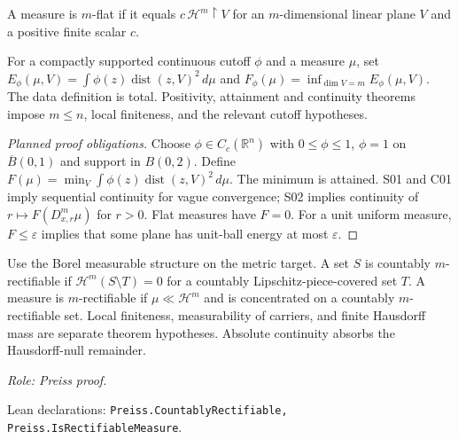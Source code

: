 \begin{definition}
\label{def:flat}










A measure is $m$-flat if it equals $c\,\mathcal H^m\!\restriction V$ for an $m$-dimensional linear plane $V$ and a positive finite scalar $c$.
\end{definition}

\begin{definition}
\label{def:flatness}








For a compactly supported continuous cutoff $\phi$ and a measure $\mu$, set $E_\phi(\mu,V)=\int\phi(z)\operatorname{dist}(z,V)^2\,d\mu$ and $F_\phi(\mu)=\inf_{\dim V=m}E_\phi(\mu,V)$. The data definition is total. Positivity, attainment and continuity theorems impose $m\leq n$, local finiteness, and the relevant cutoff hypotheses.
\end{definition}
\begin{proof}[Planned proof obligations]
Choose $\phi\in C_c(\mathbb R^n)$ with $0\leq\phi\leq1$,
$\phi=1$ on $\overline B(0,1)$ and support in $B(0,2)$.
Define $F(\mu)=\min_V\int\phi(z)\operatorname{dist}(z,V)^2\,d\mu$.
The minimum is attained. S01 and C01 imply sequential continuity for vague
convergence; S02 implies continuity of $r\mapsto F(D^m_{x,r}\mu)$ for $r>0$.
Flat measures have $F=0$. For a unit uniform measure, $F\leq\varepsilon$
implies that some plane has unit-ball energy at most $\varepsilon$.
\end{proof}

\begin{definition}
\label{def:rectifiable}










Use the Borel measurable structure on the metric target.
A set $S$ is countably $m$-rectifiable if $\mathcal H^m(S\setminus T)=0$ for a countably Lipschitz-piece-covered set $T$. A measure is $m$-rectifiable if $\mu\ll\mathcal H^m$ and is concentrated on a countably $m$-rectifiable set. Local finiteness, measurability of carriers, and finite Hausdorff mass are separate theorem hypotheses. Absolute continuity absorbs the Hausdorff-null remainder.
\par\emph{Role: Preiss proof.}
\par Lean declarations: \texttt{Preiss.CountablyRectifiable, Preiss.IsRectifiableMeasure}.
\end{definition}


